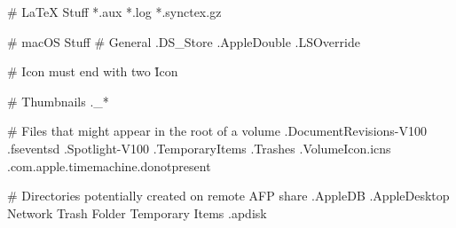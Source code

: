 # LaTeX Stuff
*.aux
*.log
*.synctex.gz

# macOS Stuff
# General
.DS_Store
.AppleDouble
.LSOverride

# Icon must end with two \r
Icon

# Thumbnails
._*

# Files that might appear in the root of a volume
.DocumentRevisions-V100
.fseventsd
.Spotlight-V100
.TemporaryItems
.Trashes
.VolumeIcon.icns
.com.apple.timemachine.donotpresent

# Directories potentially created on remote AFP share
.AppleDB
.AppleDesktop
Network Trash Folder
Temporary Items
.apdisk